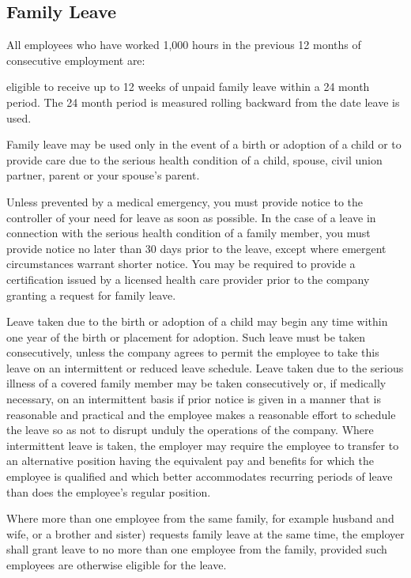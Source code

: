 \documentclass{book}
\begin{document}
\subsection{Family Leave}

All employees who have worked 1,000 hours in the previous 12 months of consecutive employment are:

eligible to receive up to 12 weeks of unpaid family leave within a 24 month period. The 24 month period is measured rolling backward from the date leave is used.

Family leave may be used only in the event of a birth or adoption of a child or to provide care due to the serious health condition of a child, spouse, civil union partner, parent or your spouse's parent.

Unless prevented by a medical emergency, you must provide notice to the controller of your need for leave as soon as possible. In the case of a leave in connection with the serious health condition of a family member, you must provide notice no later than 30 days prior to the leave, except where emergent circumstances warrant shorter notice. You may be required to provide a certification issued by a licensed health care provider prior to the company granting a request for family leave.

Leave taken due to the birth or adoption of a child may begin any time within one year of the birth or placement for adoption. Such leave must be taken consecutively, unless the company agrees to permit the employee to take this leave on an intermittent or reduced leave schedule. Leave taken due to the serious illness of a covered family member may be taken consecutively or, if medically necessary, on an intermittent basis if prior notice is given in a manner that is reasonable and practical and the employee makes a reasonable effort to schedule the leave so as not to disrupt unduly the operations of the company. Where intermittent leave is taken, the employer may require the employee to transfer to an alternative position having the equivalent pay and benefits for which the employee is qualified and which better accommodates recurring periods of leave than does the employee's regular position.

Where more than one employee from the same family, for example husband and wife, or a brother and sister) requests family leave at the same time, the employer shall grant leave to no more than one employee from the family, provided such employees are otherwise eligible for the leave.
\end{document}
